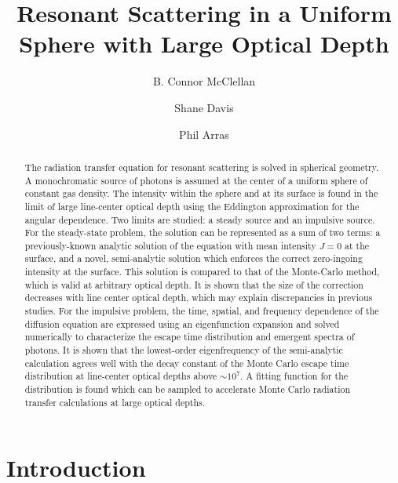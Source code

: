 \documentclass{aastex63}
\begin{document}
\title{Resonant Scattering in a Uniform Sphere with Large Optical Depth}




\author{B. Connor McClellan}
\author{Shane Davis}
\author{Phil Arras}


\begin{abstract}

The radiation transfer equation for resonant scattering is solved in spherical geometry. A monochromatic source of photons is assumed at the center of a uniform sphere of constant gas density. The intensity within the sphere and at its surface is found in the limit of large line-center optical depth using the Eddington approximation for the angular dependence. Two limits are studied: a steady source and an impulsive source. For the steady-state problem, the solution can be represented as a sum of two terms: a previously-known analytic solution of the equation with  mean intensity $J=0$ at the surface, and a novel, semi-analytic solution which enforces the correct zero-ingoing intensity at the surface. This solution is compared to that of the Monte-Carlo method, which is valid at arbitrary optical depth. It is shown that the size of the correction decreases with line center optical depth, which may explain discrepancies in previous studies. For the impulsive problem, the time, spatial, and frequency dependence of the diffusion equation are expressed using an eigenfunction expansion and solved numerically to characterize the escape time distribution and emergent spectra of photons. It is shown that the lowest-order eigenfrequency of the semi-analytic calculation agrees well with the decay constant of the Monte Carlo escape time distribution at line-center optical depths above ${\sim} 10^7$. A fitting function for the distribution is found which can be sampled to accelerate Monte Carlo radiation transfer calculations at large optical depths.

\end{abstract}


\keywords{}

\section{Introduction}
\label{sec:intro}
\end{document}
